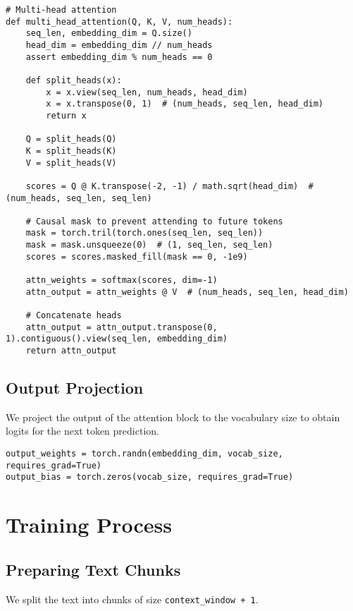 \documentclass{article}
\begin{document}
\begin{lstlisting}[style=pythonstyle]
# Multi-head attention
def multi_head_attention(Q, K, V, num_heads):
    seq_len, embedding_dim = Q.size()
    head_dim = embedding_dim // num_heads
    assert embedding_dim % num_heads == 0

    def split_heads(x):
        x = x.view(seq_len, num_heads, head_dim)
        x = x.transpose(0, 1)  # (num_heads, seq_len, head_dim)
        return x

    Q = split_heads(Q)
    K = split_heads(K)
    V = split_heads(V)

    scores = Q @ K.transpose(-2, -1) / math.sqrt(head_dim)  # (num_heads, seq_len, seq_len)

    # Causal mask to prevent attending to future tokens
    mask = torch.tril(torch.ones(seq_len, seq_len))
    mask = mask.unsqueeze(0)  # (1, seq_len, seq_len)
    scores = scores.masked_fill(mask == 0, -1e9)

    attn_weights = softmax(scores, dim=-1)
    attn_output = attn_weights @ V  # (num_heads, seq_len, head_dim)

    # Concatenate heads
    attn_output = attn_output.transpose(0, 1).contiguous().view(seq_len, embedding_dim)
    return attn_output
\end{lstlisting}

\subsection{Output Projection}

We project the output of the attention block to the vocabulary size to obtain logits for the next token prediction.

\begin{lstlisting}[style=pythonstyle]
output_weights = torch.randn(embedding_dim, vocab_size, requires_grad=True)
output_bias = torch.zeros(vocab_size, requires_grad=True)
\end{lstlisting}

\section{Training Process}

\subsection{Preparing Text Chunks}

We split the text into chunks of size \texttt{context\_window + 1}.
\end{document}
